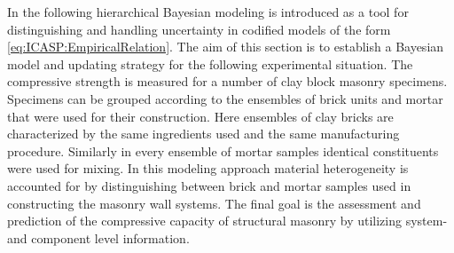 In the following hierarchical Bayesian modeling is introduced as a tool for distinguishing and handling uncertainty in codified models of the form \cref{eq:ICASP:EmpiricalRelation}.
The aim of this section is to establish a Bayesian model and updating strategy for the following experimental situation.
The compressive strength is measured for a number of clay block masonry specimens.
Specimens can be grouped according to the ensembles of brick units and mortar that were used for their construction.
Here ensembles of clay bricks are characterized by the same ingredients used and the same manufacturing procedure.
Similarly in every ensemble of mortar samples identical constituents were used for mixing.
In this modeling approach material heterogeneity is accounted for by distinguishing between brick and mortar samples used in constructing the masonry wall systems.
The final goal is the assessment and prediction of the compressive capacity of structural masonry by utilizing system- and component level information.

